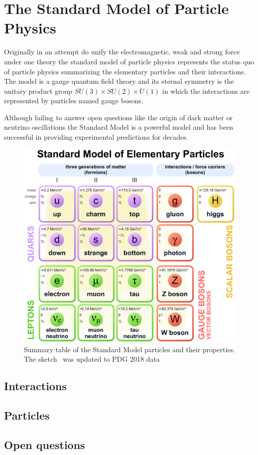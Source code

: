 



\chapter{The Standard Model of Particle Physics}
\label{chp:sm}

Originally in an attempt do unify the electromagnetic, weak and strong force under one theory the standard model of particle physics represents the status quo of particle physics summarizing the elementary particles and their interactions.
The model is a gauge quantum field theory and its eternal symmetry is the unitary product group $SU(3) \times SU(2) \times U(1)$ in which the interactions are represented by particles named gauge bosons.

Although failing to answer open questions like the origin of dark matter or neutrino oscillations the Standard Model is a powerful model and has been successful in providing experimental predictions for decades.

\begin{figure}
	\centering
	\includegraphics[width=\textwidth]{figures_SM/standard_model.eps}
	\caption[Standard Model particles]{Summary table of the Standard Model particles and their properties. The sketch~\cite{standard_model} was updated to PDG 2018 data~\cite{PDG}}
	\label{fig:sm}
\end{figure}



\section{Interactions}

\section{Particles}

\section{Open questions}